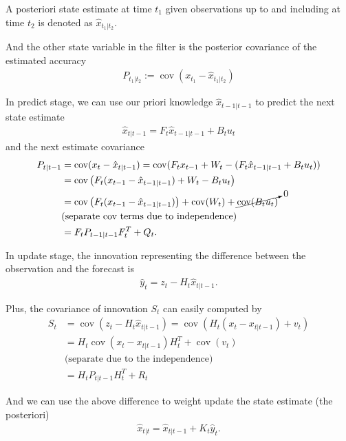 \documentclass{article}
\newcommand{\cov}{\operatorname{cov}}
\begin{document}
A posteriori state estimate at time $t_1$ given
observations up to and including at time $t_2$ is denoted as
$\hat{x}_{t_1|t_2}$.

And the other state variable in the filter is the posterior
covariance of the estimated accuracy
\begin{align*}
  P_{t_1|t_2} := \cov(x_{t_1} - \hat{x}_{t_1|t_2})
\end{align*}


In predict stage, we can use our priori knowledge $\hat{x}_{t-1|t-1}$ to
predict the next state estimate
\begin{align*}
  \hat{x}_{t|t-1} = F_{t}\hat{x}_{t-1|t-1} + B_{t}u_{t}
\end{align*}
and the next estimate covariance
\begin{align*}
  P_{t|t-1}
  &= \cov(x_{t} - \hat{x}_{t|t-1})
  = \cov(F_{t} x_{t-1} + W_{t} - (F_{t}\hat{x}_{t-1|t-1} + B_{t}u_{t}))\\
  &= \cov\left(F_{t} (x_{t-1} - \hat{x}_{t-1|t-1}) + W_{t} - B_{t} u_{t}\right) \\
  &= \cov\left(F_{t} (x_{t-1} - \hat{x}_{t-1|t-1})\right)
  + \cov(W_{t}) + \cancelto{0}{\cov(B_{t} u_{t})}\\
  &\text{(separate cov terms due to independence)}\\
  &= F_{t} P_{t-1|t-1} F_{t}^{T} + Q_{t}
.\end{align*}

In update stage, the innovation representing the difference
between the observation and the forecast is
\begin{align*}
  \hat{y}_{t} = z_{t} - H_{t} \hat{x}_{t|t-1}
.\end{align*}

Plus, the covariance of innovation $S_{t}$ can easily computed by
\begin{align*}
  S_{t}
  &= \cov(z_{t} - H_{t}\hat{x}_{t|t-1})
  = \cov(H_{t}(x_{t} - x_{t|t-1}) + v_{t})\\
  &= H_{t} \cov(x_{t} - x_{t|t-1}) H_{t}^{T} + \cov(v_{t})\\
  &\text{(separate due to the independence)}\\
  &= H_{t} P_{t|t-1} H_{t}^{T} + R_{t}
\end{align*}

And we can use the above difference to weight update
the state estimate (the posteriori)
\begin{align*}
  \hat{x}_{t|t} = \hat{x}_{t|t-1} + K_{t} \hat{y}_{t}
.\end{align*}
\end{document}
